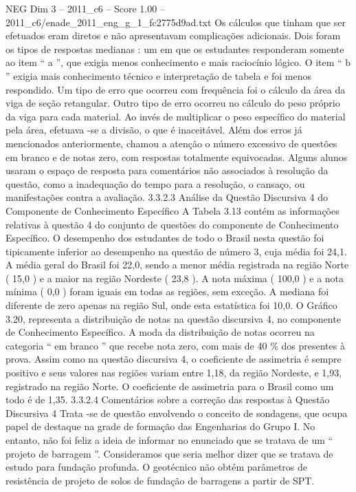 \begin{textsample}{NEG Dim 3 – 2011\_c6 – Score 1.00 – 2011\_c6/enade\_2011\_eng\_g\_1\_fc2775d9ad.txt}
Os cálculos que tinham que ser efetuados eram diretos e não apresentavam complicações adicionais.
Dois foram os tipos de respostas medianas : um em que os estudantes responderam somente ao item “ a ”, que exigia menos conhecimento e mais raciocínio lógico.
O item “ b ” exigia mais conhecimento técnico e interpretação de tabela e foi menos respondido.
Um tipo de erro que ocorreu com frequência foi o cálculo da área da viga de seção retangular.
Outro tipo de erro ocorreu no cálculo do peso próprio da viga para cada material.
Ao invés de multiplicar o peso específico do material pela área, efetuava -se a divisão, o que é inaceitável.
Além dos erros já mencionados anteriormente, chamou a atenção o número excessivo de questões em branco e de notas zero, com respostas totalmente equivocadas.
Alguns alunos usaram o espaço de resposta para comentários não associados à resolução da questão, como a inadequação do tempo para a resolução, o cansaço, ou manifestações contra a avaliação. 3.3.2.3 Análise da Questão Discursiva 4 do Componente de Conhecimento Específico A Tabela 3.13 contém as informações relativas à questão 4 do conjunto de questões do componente de Conhecimento Específico.
O desempenho dos estudantes de todo o Brasil nesta questão foi tipicamente inferior ao desempenho na questão de número 3, cuja média foi 24,1.
A média geral do Brasil foi 22,0, sendo a menor média registrada na região Norte ( 15,0 ) e a maior na região Nordeste ( 23,8 ).
A nota máxima ( 100,0 ) e a nota mínima ( 0,0 ) foram iguais em todas as regiões, sem exceção.
A mediana foi diferente de zero apenas na região Sul, onde esta estatística foi 10,0.
O Gráfico 3.20, representa a distribuição de notas na questão discursiva 4, no componente de Conhecimento Específico.
A moda da distribuição de notas ocorreu na categoria “ em branco ” que recebe nota zero, com mais de 40 \% dos presentes à prova.
Assim como na questão discursiva 4, o coeficiente de assimetria é sempre positivo e seus valores nas regiões variam entre 1,18, da região Nordeste, e 1,93, registrado na região Norte.
O coeficiente de assimetria para o Brasil como um todo é de 1,35. 3.3.2.4 Comentários sobre a correção das respostas à Questão Discursiva 4 Trata -se de questão envolvendo o conceito de sondagens, que ocupa papel de destaque na grade de formação das Engenharias do Grupo I.
No entanto, não foi feliz a ideia de informar no enunciado que se tratava de um “ projeto de barragem ”.
Consideramos que seria melhor dizer que se tratava de estudo para fundação profunda.
O geotécnico não obtém parâmetros de resistência de projeto de solos de fundação de barragens a partir de SPT.

\end{textsample}
